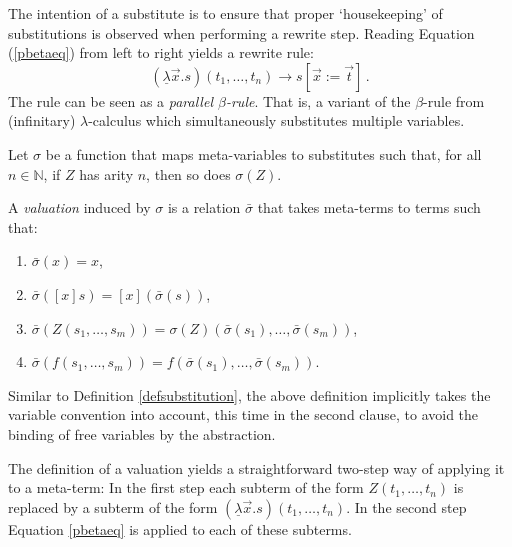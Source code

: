 \documentclass{LMCS}
\theoremstyle{definition}
\newcommand{\rew}{\rightarrow}
\newcommand{\ulam}{\underline{\lambda}}
\begin{document}
The intention of a substitute is to ensure that proper `housekeeping' 
of substitutions is observed when performing a rewrite step. Reading Equation (\ref{pbetaeq}) from left to right yields a rewrite rule:
\[
(\ulam \vec{x}. s)(t_1, \ldots, t_n) \rew s[\vec{x} := \vec{t}] \, .
\]
The rule can be seen as a \emph{parallel $\beta$-rule}. That is, a variant of the $\beta$-rule from (infinitary) $\lambda$-calculus which simultaneously substitutes multiple variables.

\begin{defi}
\label{defvaluation}
Let $\sigma$ be a function that maps meta-variables to substitutes
such that, for all $n \in \mathbb{N}$, if $Z$ has arity $n$, then so
does $\sigma(Z)$.

A \emph{valuation} induced by $\sigma$ is a relation $\bar{\sigma}$ that takes meta-terms to terms such that:
\begin{enumerate}[(1)]
\item
$\bar{\sigma}(x) = x$,
\item
$\bar{\sigma}([x]s) = [x](\bar{\sigma}(s))$,
\item
$\bar{\sigma}(Z(s_1, \ldots, s_m)) = \sigma(Z)(\bar{\sigma}(s_1), \ldots, \bar{\sigma}(s_m))$,
\item
$\bar{\sigma}(f(s_1, \ldots, s_m)) = f(\bar{\sigma}(s_1), \ldots, \bar{\sigma}(s_m))$.
\end{enumerate}

\end{defi}

Similar to Definition \ref{defsubstitution}, the above definition implicitly takes the variable convention into account, this time in the second clause, to avoid the binding of free variables by the abstraction.

The definition of a valuation yields a straightforward two-step way of applying it to a meta-term: In the first step each subterm of the form $Z(t_1, \ldots, t_n)$ is replaced by a subterm of the form $(\ulam \vec{x}. s)(t_1, \ldots, t_n)$. In the second step Equation \eqref{pbetaeq} is applied to each of these subterms.
\end{document}
